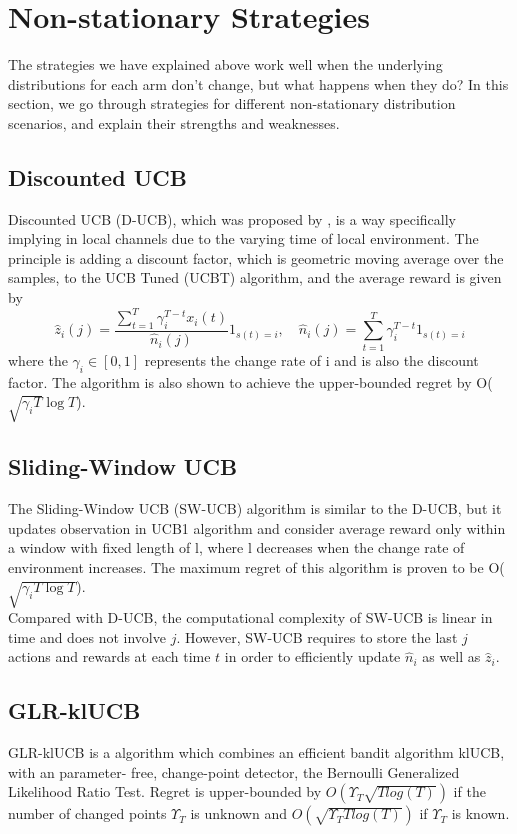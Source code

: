 \section{Non-stationary Strategies}\label{sec:non-stationary-strategies}
The strategies we have explained above work well when the underlying distributions for each arm don't change, but what happens when they do?
In this section, we go through strategies for different non-stationary distribution scenarios, and explain their strengths and weaknesses.

\subsection{Discounted UCB}\label{subsec:discounted-ucb}
Discounted UCB (D-UCB), which was proposed by \citep{kocsis2006discounted}, is a way specifically implying in local channels due to the varying time of local environment.
The principle is adding a discount factor, which is geometric moving average over the samples, to the UCB Tuned (UCBT) algorithm, and the average reward is given by
\begin{equation*}
    \hat{z}_i(j)=\frac{\sum_{t=1}^T\gamma_i^{T-t}x_i(t)}{\hat{n}_i(j)}\mathfrak{1}_{s(t)=i}, \quad
    {\hat{n}_i(j)}=\sum_{t=1}^T\gamma_i^{T-t}\mathfrak{1}_{s(t)=i}
\end{equation*}where the $\gamma_i \in[0,1]$ represents the change rate of i and is also the discount factor.
The algorithm is also shown to achieve the upper-bounded regret by O($\sqrt{\gamma_{i}T}\log{T}$)\citep{garivier2008upper}.

\subsection{Sliding-Window UCB}\label{subsec:sliding-window-ucb}
The Sliding-Window UCB (SW-UCB) algorithm is similar to the D-UCB, but it updates observation in UCB1 algorithm and consider average reward only within a window with fixed length of l, where l decreases when the change rate of environment increases.
The maximum regret of this algorithm is proven to be O($\sqrt{\gamma_{i}T\log{T}}$)\citep{garivier2008upper}.
\\Compared with D-UCB, the computational complexity of SW-UCB is linear in time and does not involve $j$. However, SW-UCB requires to store the last $j$ actions and rewards at each time $t$ in order to efficiently update ${\hat{n}_i}$ as well as ${\hat{z}_i}$.\citep{garivier2008upper}

\subsection{GLR-klUCB}\label{subsec:glr-klucb}
GLR-klUCB is a algorithm which combines an efficient bandit algorithm klUCB, with an parameter- free, change-point detector, the Bernoulli Generalized Likelihood Ratio Test.
Regret is upper-bounded by $ O(\Upsilon_T \sqrt{T log(T)} )$ if the number of changed points $\Upsilon_T $ is unknown and $ O(\sqrt{\Upsilon_T T log(T)} )$ if  $\Upsilon_T $ is known.\citep{Besson2019}


